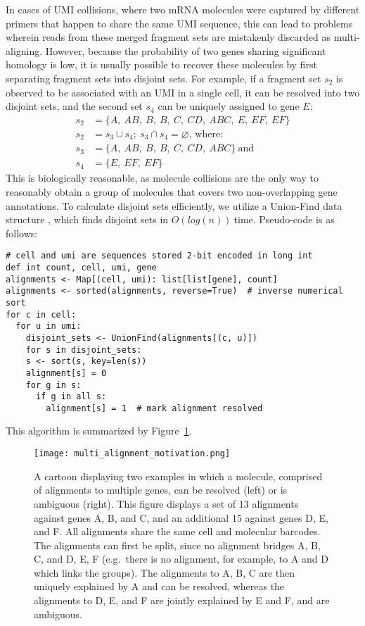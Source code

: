 In cases of UMI collisions, where two mRNA molecules were captured by different primers that happen to share the same UMI sequence, this can lead to problems wherein reads from these merged fragment sets are mistakenly discarded as multi-aligning. 
However, because the probability of two genes sharing significant homology is low, it is usually possible to recover these molecules by first separating fragment sets into disjoint sets. 
For example, if a fragment set $s_2$ is observed to be associated with an UMI in a single cell, it can be resolved into two disjoint sets, and the second set $s_4$ can be uniquely assigned to gene $E$: 
\begin{align*}
  s_{2} & = \{ A,\ AB,\ B,\ B,\ C,\ CD,\ ABC,\ E,\ EF,\ EF\} \\
  s_{2} & = s_{3} \cup s_{4};\ s_{3} \cap s_{4} = \varnothing \text{, where}: \\
  s_{3} & = \{ A,\ AB,\ B,\ B,\ C,\ CD,\ ABC\}\ \text{and} \\ 
  s_{4} & = \{ E,\ EF,\ EF\}
\end{align*}
This is biologically reasonable, as molecule collisions are the only way to reasonably obtain a group of molecules that covers two non-overlapping gene annotations.
To calculate disjoint sets efficiently, we utilize a Union-Find data structure \citep{Aho1983}, which finds disjoint sets in \(O(log(n))\ \)time. 
Pseudo-code is as follows:

\begin{verbatim}
# cell and umi are sequences stored 2-bit encoded in long int
def int count, cell, umi, gene
alignments <- Map[(cell, umi): list[list[gene], count]
alignments <- sorted(alignments, reverse=True)  # inverse numerical sort
for c in cell:
  for u in umi:
    disjoint_sets <- UnionFind(alignments[(c, u)])
    for s in disjoint_sets:
    s <- sort(s, key=len(s))
    alignment[s] = 0
    for g in s:
      if g in all s:
        alignment[s] = 1  # mark alignment resolved
\end{verbatim}

This algorithm is summarized by Figure~\ref{fig:multi-alignment}. 

\begin{figure}
\centering
\texttt{[image: multi\_alignment\_motivation.png]}
\caption{A cartoon displaying two examples in which a molecule, comprised of alignments to multiple genes, can be resolved (left) or is ambiguous (right).
This figure displays a set of 13 alignments against genes A, B, and C, and an additional 15 against genes D, E, and F. 
All alignments share the same cell and molecular barcodes.
The alignments can first be split, since no alignment bridges A, B, C, and D, E, F (e.g.\ there is no alignment, for example, to A and D which links the groups).
The alignments to A, B, C are then uniquely explained by A and can be resolved, whereas the alignments to D, E, and F are jointly explained by E and F, and are ambiguous.}
\label{fig:multi-alignment}
\end{figure}

